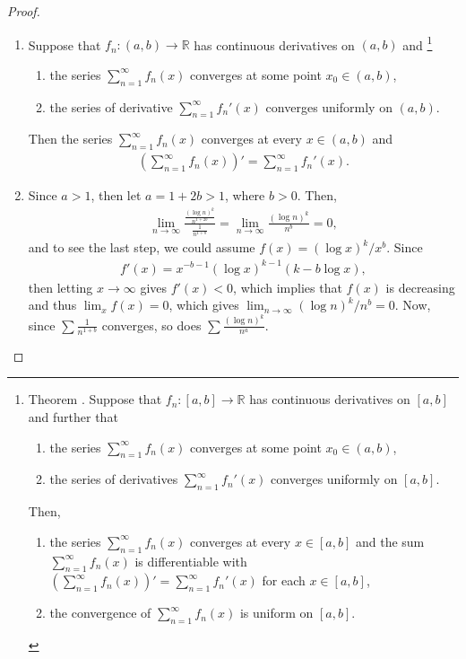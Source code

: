 \documentclass[11pt]{article}
\makeatletter
\theoremstyle{definition}
\numberwithin{equation}{subsection}
\newenvironment{intheorem}[1][]
  {%
   \refstepcounter{theorem}%
   {\the\thm@headfont Theorem \thetheorem\@ifempty{#1}{}{ (#1)}.}%
   \the\thm@bodyfont
  }%
  {\par}
\makeatother
\begin{document}
\begin{proof}
~\begin{enumerate}[label=(\alph*)]
    \item Suppose that $f_n:(a,b) \to \mathbb{R}$ has continuous derivatives on $(a,b)$ and \footnote{\begin{intheorem}{\rm \cite{10}}
    Suppose that $f_n:[a,b] \to \mathbb{R}$ has continuous derivatives on $[a,b]$ and further that
    \begin{enumerate}[label=(\alph*)]
        \item the series $  \sum^\infty_{n=1} f_n(x)$ converges at some point $x_0 \in (a, b)$,
        
        \item the series of derivatives $  \sum^\infty_{n=1} f_n'(x)$ converges uniformly on $[a,b]$.
    \end{enumerate}
    Then,
    \begin{enumerate}[label=(\alph*)]
        \item the series $  \sum^\infty_{n=1} f_n(x)$ converges at every $x \in [a,b]$ and the sum $  \sum^\infty_{n=1} f_n(x)$ is differentiable with $  \left( \sum^\infty_{n=1} f_n(x) \right)' = \sum^\infty_{n=1} f_n'(x)$ for each $x \in [a,b]$,
        
        \item the convergence of $  \sum^\infty_{n=1} f_n(x)$ is uniform on $[a,b]$.
    \end{enumerate}
    \end{intheorem}}
    \begin{enumerate}[label=\arabic*)]
        \item the series $  \sum^\infty_{n=1} f_n(x)$ converges at some point $x_0 \in (a, b)$,
        
        \item the series of derivative $  \sum^\infty_{n=1} f_n'(x)$ converges uniformly on $(a,b)$.
    \end{enumerate}
    Then the series $  \sum^\infty_{n=1} f_n(x)$ converges at every $x \in (a,b)$ and
    \begin{align*}
        \left(\sum^\infty_{n=1}f_n(x) \right)' = \sum^\infty_{n=1} f_n'(x).
    \end{align*}
    
    \item Since $a > 1$, then let $a = 1 + 2b > 1$, where $b > 0$. Then,
    \begin{align*}
        \lim_{n\to\infty} \frac{\frac{(\log n)^k}{n^{1+2b}}}{\frac{1}{n^{1+b}}} = \lim_{n\to\infty} \frac{(\log n)^k}{n^b} = 0,
    \end{align*}
    and to see the last step, we could assume $f(x) = (\log x)^k / x^b$. Since 
    \begin{align*}
        f'(x) = x^{-b-1} (\log x)^{k-1} (k - b \log x),
    \end{align*}
    then letting $x \to \infty$ gives $f'(x) < 0$, which implies that $f(x)$ is decreasing and thus $\lim_{x} f(x) = 0$, which gives $\lim_{n\to\infty} (\log n)^k / n^b = 0$. Now, since $  \sum \frac{1}{n^{1+b}}$ converges, so does $  \sum \frac{(\log n)^k}{n^a}$.
    

\end{enumerate}
\end{proof}
\end{document}
